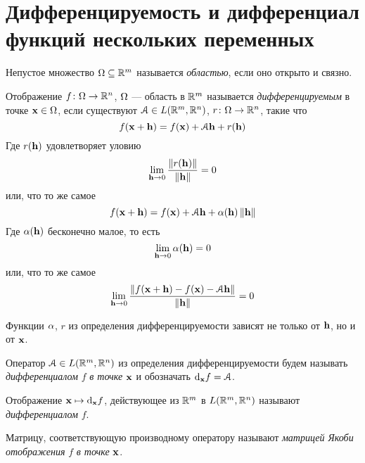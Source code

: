 \section{Дифференцируемость и дифференциал функций нескольких переменных}

\begin{definition}
    Непустое множество $\Omega \subseteq \mathbb{R}^m$ называется \textit{областью},
    если оно открыто и связно.
\end{definition}

\begin{definition}
    Отображение $f \colon \Omega \to \mathbb{R}^n$, $\Omega$ --- область в $\mathbb{R}^m$ называется
    \textit{дифференцируемым} в точке $\mathbf{x} \in \Omega$, если существуют $\mathcal{A} \in
    L(\mathbb{R}^m , \mathbb{R}^n)$, $r \colon \Omega \to \mathbb{R}^n$, такие что
\[
    f(\mathbf{x} + \mathbf{h}) = f(\mathbf{x}) + \mathcal{A} \mathbf{h} + r(\mathbf{h})
\]
    Где $r(\mathbf{h})$ удовлетворяет уловию
\[
    \lim_{\mathbf{h} \to 0}{\frac{\left\lVert r(\mathbf{h})\right\rVert}{\left\lVert\mathbf{h}\right\rVert}} = 0
\]
    или, что то же самое
\[
    f(\mathbf{x} + \mathbf{h}) = f(\mathbf{x}) + \mathcal{A} \mathbf{h} + \alpha(\mathbf{h})\left\lVert\mathbf{h}\right\rVert
\]
    Где $\alpha(\mathbf{h})$ бесконечно малое, то есть
\[
    \lim_{\mathbf{h} \to 0}{\alpha(\mathbf{h})} = 0
\]
    или, что то же самое
\[
    \lim_{\mathbf{h} \to 0}{\frac{\left\lVert f(\mathbf{x} + \mathbf{h}) - f(\mathbf{x}) - \mathcal{A} \mathbf{h}\right\rVert}{\left\lVert\mathbf{h}\right\rVert}} = 0
\]
\end{definition}

\begin{remark}
    Функции $\alpha$, $r$ из определения дифференцируемости зависят не только от $\mathbf{h}$,
    но и от $\mathbf{x}$.
\end{remark}

\begin{definition}
    Оператор $\mathcal{A} \in L(\mathbb{R}^m, \mathbb{R}^n)$ из определения дифференцируемости будем
    называть \textit{дифференциалом} $f$ \textit{в точке} $\mathbf{x}$ и обозначать
    $\mathrm{d}_{\mathbf{x}}{f} = \mathcal{A}$.
\end{definition}

\begin{remark}
    Отображение $\mathbf{x} \mapsto \mathrm{d}_{\mathbf{x}}{f}$, действующее из $\mathbb{R}^m$ в $L(\mathbb{R}^m, \mathbb{R}^n)$
    называют \textit{дифференциалом} $f$.
\end{remark}

\begin{definition}
    Матрицу, соответствующую производному оператору называют \textit{матрицей
    Якоби отображения} $f$ \textit{в точке} $\mathbf{x}$.
\end{definition}


